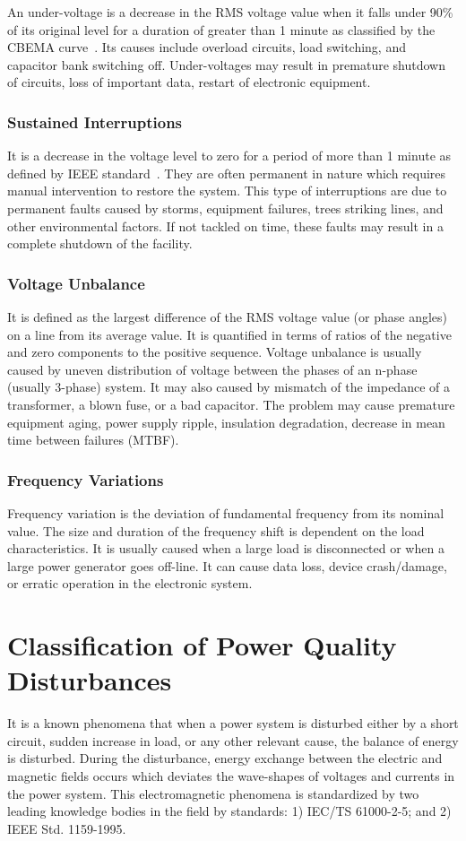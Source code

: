 An under-voltage is a decrease in the RMS voltage value when it falls under 90\% of its original level for a duration of greater than 1 minute as classified by the CBEMA curve~\cite{iti_curve}. Its causes include overload circuits, load switching, and capacitor bank switching off. Under-voltages may result in premature shutdown of circuits, loss of important data, restart of electronic equipment.

\subsubsection{Sustained Interruptions}
It is a decrease in the voltage level to zero for a period of more than 1 minute as defined by IEEE standard~\cite{IEEE09_1159}. They are often permanent in nature which requires manual intervention to restore the system. This type of interruptions are due to permanent faults caused by storms, equipment failures, trees striking lines, and other environmental factors. If not tackled on time, these faults may result in a complete shutdown of the facility.

\subsubsection{Voltage Unbalance}
It is defined as the largest difference of the RMS voltage value (or phase angles) on a line from its average value. It is quantified in terms of ratios of the negative and zero components to the positive sequence. Voltage unbalance is usually caused by uneven distribution of voltage between the phases of an n-phase (usually 3-phase) system. It may also caused by mismatch of the impedance of a transformer, a blown fuse, or a bad capacitor. The problem may cause premature equipment aging, power supply ripple, insulation degradation, decrease in mean time between failures (MTBF).

\subsubsection{Frequency Variations}
Frequency variation is the deviation of fundamental frequency from its nominal value. The size and duration of the frequency shift is dependent on the load characteristics. It is usually caused when a large load is disconnected or when a large power generator goes off-line. It can cause data loss, device crash/damage, or erratic operation in the electronic system.

\section{Classification of Power Quality Disturbances}
\label{PQclassification}
It is a known phenomena that when a power system is disturbed either by a short circuit, sudden increase in load, or any other relevant cause, the balance of energy is disturbed. During the disturbance, energy exchange between the electric and magnetic fields occurs which deviates the wave-shapes of voltages and currents in the power system. This electromagnetic phenomena is standardized by two leading knowledge bodies in the field by standards: 1) IEC/TS 61000-2-5; and 2) IEEE Std. 1159-1995.


